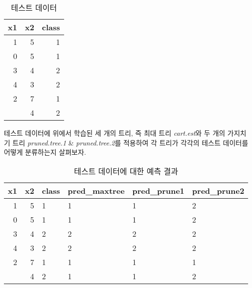 \documentclass[]{book}
\newenvironment{Shaded}{\begin{snugshade}}{\end{snugshade}}
\newcommand{\DataTypeTok}[1]{\textcolor[rgb]{0.13,0.29,0.53}{#1}}
\newcommand{\FloatTok}[1]{\textcolor[rgb]{0.00,0.00,0.81}{#1}}
\newcommand{\KeywordTok}[1]{\textcolor[rgb]{0.13,0.29,0.53}{\textbf{#1}}}
\newcommand{\NormalTok}[1]{#1}
\newcommand{\OperatorTok}[1]{\textcolor[rgb]{0.81,0.36,0.00}{\textbf{#1}}}
\newcommand{\StringTok}[1]{\textcolor[rgb]{0.31,0.60,0.02}{#1}}
\begin{document}
\begin{table}[t]

\caption{\label{tab:tree-test-data-table}테스트 데이터}
\centering
\begin{tabular}{rrr}
\toprule
x1 & x2 & class\\
\midrule
1 & 5 & 1\\
0 & 5 & 1\\
3 & 4 & 2\\
4 & 3 & 2\\
2 & 7 & 1\\
\addlinespace
1 & 4 & 2\\
\bottomrule
\end{tabular}
\end{table}

테스트 데이터에 위에서 학습된 세 개의 트리, 즉 최대 트리 \emph{cart.est}와 두 개의 가지치기 트리 \emph{pruned.tree.1} \& \emph{pruned.tree.2}를 적용하여 각 트리가 각각의 테스트 데이터를 어떻게 분류하는지 살펴보자.

\begin{Shaded}
\end{Shaded}

\begin{table}[t]

\caption{\label{tab:tree-class-prediction-table}테스트 데이터에 대한 예측 결과}
\centering
\begin{tabular}{rrllll}
\toprule
x1 & x2 & class & pred\_maxtree & pred\_prune1 & pred\_prune2\\
\midrule
1 & 5 & 1 & 1 & 1 & 2\\
0 & 5 & 1 & 1 & 1 & 2\\
3 & 4 & 2 & 2 & 2 & 2\\
4 & 3 & 2 & 2 & 2 & 2\\
2 & 7 & 1 & 1 & 1 & 1\\
\addlinespace
1 & 4 & 2 & 1 & 1 & 2\\
\bottomrule
\end{tabular}
\end{table}
\end{document}
